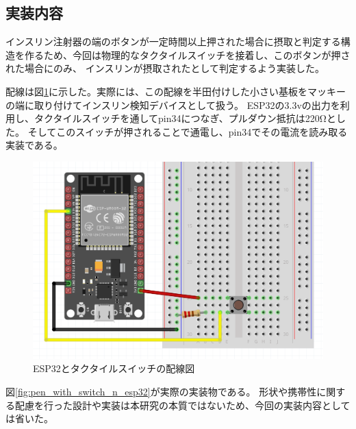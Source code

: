 \subsection{実装内容}

インスリン注射器の端のボタンが一定時間以上押された場合に摂取と判定する構造を作るため、今回は物理的なタクタイルスイッチを接着し、このボタンが押された場合にのみ、
インスリンが摂取されたとして判定するよう実装した。

配線は図\ref{fig:esp32_switch}に示した。実際には、この配線を半田付けした小さい基板をマッキーの端に取り付けてインスリン検知デバイスとして扱う。
ESP32の3.3vの出力を利用し、タクタイルスイッチを通してpin34につなぎ、プルダウン抵抗は220Ωとした。
そしてこのスイッチが押されることで通電し、pin34でその電流を読み取る実装である。

\begin{figure}[htbp]
  \caption{ESP32とタクタイルスイッチの配線図}
  \label{fig:esp32_switch}
  \begin{center}
    \includegraphics[bb=0 0 1000 550,width=17cm]{assets/esp32_switch.png}
  \end{center}
\end{figure}

図\ref{fig:pen_with_switch_n_esp32}が実際の実装物である。
形状や携帯性に関する配慮を行った設計や実装は本研究の本質ではないため、今回の実装内容としては省いた。

